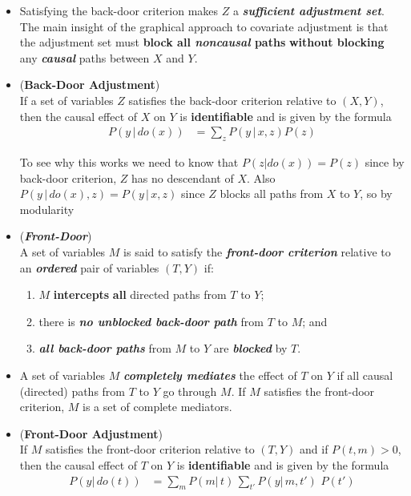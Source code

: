 \documentclass[11pt]{article}
\begin{document}
\begin{itemize}
\item  Satisfying the back-door criterion makes $Z$ a \emph{\textbf{sufficient adjustment set}}. The main insight of the graphical approach to covariate adjustment is that the adjustment set must \textbf{block all \emph{noncausal} paths} \textbf{without blocking} any \emph{\textbf{causal}} paths between $X$ and $Y$. 

\item \begin{theorem} (\textbf{Back-Door Adjustment}) \citep{pearl2000causal, neal2020introduction}\\
If a set of variables $Z$ satisfies the back-door criterion relative to $(X, Y)$, then the causal effect of $X$ on $Y$ is \textbf{identifiable} and is given by the formula
\begin{align}
P(y\,|\, do(x)) &= \sum_{z}P(y\,|\,x,  z)P(z) \label{eqn: back_door_adjustment}
\end{align}
\end{theorem} To see why this works we need to know that $P(z| do(x)) = P(z)$ since by back-door criterion, $Z$ has no descendant of $X$. Also $P(y\,|\,do(x),  z) = P(y\,|\,x,  z)$ since $Z$ blocks all paths from $X$ to $Y$, so by modularity 

\item \begin{definition} (\emph{\textbf{Front-Door}}) \citep{pearl2000causal}\\
A set of variables $M$ is said to satisfy the \emph{\textbf{front-door criterion}} relative to an \emph{\textbf{ordered}} pair of variables $(T, Y)$ if:
\begin{enumerate}
\item $M$ \textbf{intercepts} \textbf{all} directed paths from $T$ to $Y$;
\item there is \emph{\textbf{no unblocked back-door path}} from $T$ to $M$; and
\item \emph{\textbf{all back-door paths}} from $M$ to $Y$ are \emph{\textbf{blocked}} by $T$.
\end{enumerate}
\end{definition} 

\item  A set of variables $M$ \emph{\textbf{completely mediates}} the effect of $T$ on $Y$ if all causal (directed) paths from $T$ to $Y$ go through $M$. If $M$ satisfies the front-door criterion, $M$ is a set of complete mediators.

\item \begin{theorem}(\textbf{Front-Door Adjustment}) \citep{pearl2000causal, neal2020introduction}\\
If $M$ satisfies the front-door criterion relative to $(T, Y)$ and if $P(t, m) > 0$, then the causal
effect of $T$ on $Y$ is \textbf{identifiable} and is given by the formula
\begin{align}
P(y | \, do(t)) &=  \sum_{m}P(m|\, t)\,\sum_{t'}P(y|\, m, t')\,\,P(t')
\end{align}
\end{theorem}


\end{itemize}
\end{document}
